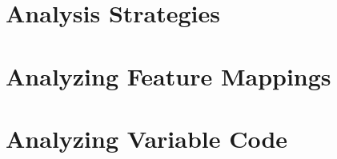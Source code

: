 \documentclass[
	aspectratio=169, %
	8pt, %
	handout, %
]{beamer}
\subtitle{10. Product-Line Analyses}
\author{Elias Kuiter, Thomas Thüm, Timo Kehrer}
\begin{document}


\section{Analysis Strategies}




\sectionend

\section{Analyzing Feature Mappings}



\lessonslearned{
	\item \ldots
}{
	\item \ldots
}{
	\ldots
}

\sectionend

\section{Analyzing Variable Code}



\lessonslearned{
	\item \ldots
}{
	\item \ldots
}{
	\ldots
}


\end{document}
